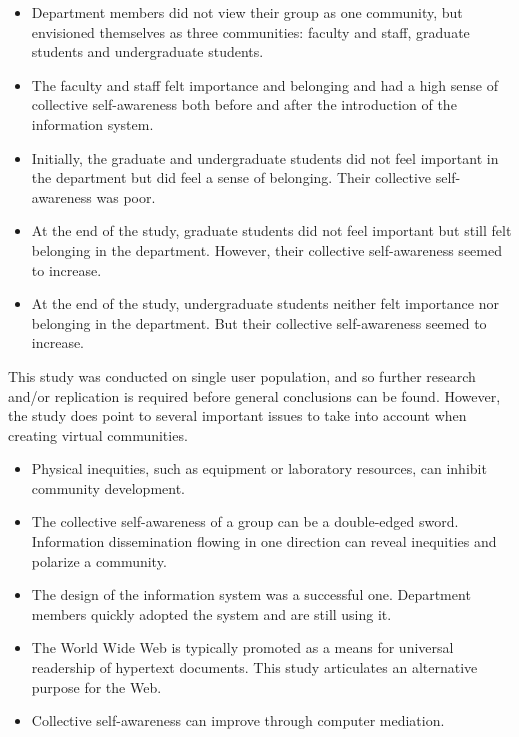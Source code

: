 \begin{itemize}
\item{Department members did not view their group as one community, but
  envisioned themselves as three communities: faculty and staff, graduate students
  and undergraduate students.}\\
\item{The faculty and staff felt importance and belonging and had a high sense
  of collective self-awareness both before and after the introduction of the
  information system.}\\
\item{Initially, the graduate and undergraduate students did not feel important
  in the department but did feel a sense of belonging.  Their collective
  self-awareness was poor.}\\
\item{At the end of the study, graduate students did not feel important but
  still felt belonging in the department.  However, their collective
  self-awareness seemed to increase.}\\
\item{At the end of the study, undergraduate students neither felt importance
  nor belonging in the department.  But their collective self-awareness seemed to
  increase.}
\end{itemize}

This study was conducted on single user population, and so further research
and/or replication is required before general conclusions can be found.
However, the study does point to several important issues to take into account
when creating virtual communities.  

\begin{itemize}
\item{Physical inequities, such as equipment or laboratory resources, can
  inhibit community development.}\\
\item{The collective self-awareness of a group can be a double-edged sword.
  Information dissemination flowing in one direction can reveal inequities
  and polarize a community.}\\
\item{The design of the information system was a successful one.  Department
  members quickly adopted the system and are still using it.}\\
\item{The World Wide Web is typically promoted as a means for universal
  readership of hypertext documents.  This study articulates an alternative
  purpose for the Web.}\\ \newpage
\item{Collective self-awareness can improve through computer mediation.}
\end{itemize}

